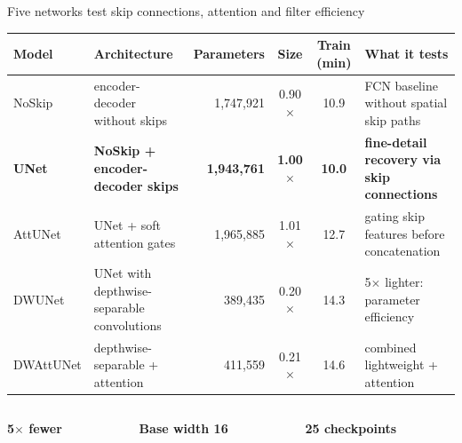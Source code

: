 \documentclass[aspectratio=169,11pt,xcolor=table]{beamer}
\newcommand{\bignum}[2]{{\fontsize{24}{26}\selectfont\bfseries\color{big}#1}\par\vspace{0.5mm}{\small #2}\par\vspace{2.5mm}}
\newcommand{\hl}{\rowcolor{big!10}}  %
\begin{document}
\begin{frame}{Five networks test skip connections, attention and filter efficiency}
  \centering\footnotesize
  \renewcommand{\arraystretch}{1.3}\setlength{\tabcolsep}{4pt}
  \begin{tabular}{@{}lp{3.2cm}rccp{3.5cm}@{}}
    \toprule
    \textbf{Model} & \textbf{Architecture} & \textbf{Parameters} & \textbf{Size} & \textbf{Train (min)} & \textbf{What it tests} \\
    \midrule
    NoSkip & encoder-decoder without skips & 1,747,921 & 0.90$\times$ & 10.9 & FCN baseline without spatial skip paths \\
    \hl\textbf{\color{big}UNet} & \textbf{\color{big}NoSkip + encoder-decoder skips} & \textbf{\color{big}1,943,761} & \textbf{\color{big}1.00$\times$} & \textbf{\color{big}10.0}
      & \textbf{\color{big}fine-detail recovery via skip connections} \\
    AttUNet & UNet + soft attention gates & 1,965,885 & 1.01$\times$ & 12.7 & gating skip features before concatenation \\
    DWUNet & UNet with depthwise-separable convolutions & 389,435 & 0.20$\times$ & 14.3 & 5$\times$ lighter: parameter efficiency \\
    DWAttUNet & depthwise-separable + attention & 411,559 & 0.21$\times$ & 14.6 & combined lightweight + attention \\
    \bottomrule
  \end{tabular}

  \vspace{5mm}
  \begin{columns}[T]
    \begin{column}{0.31\textwidth}\bignum{5$\times$ fewer}{parameters in DWUNet (389k vs 1.94M)}\end{column}
    \begin{column}{0.31\textwidth}\bignum{Base width 16}{ReLU + BatchNorm + 1$\times$1 conv + sigmoid}\end{column}
    \begin{column}{0.31\textwidth}\bignum{25 checkpoints}{5 models $\times$ 5 grouped folds, on an M3 GPU}\end{column}
  \end{columns}
\end{frame}
\end{document}
